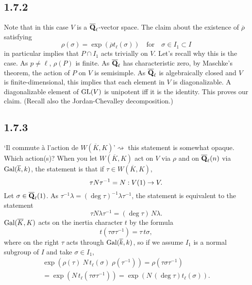 \documentclass[deligne.tex]{subfiles}
\begin{document}
\subsection*{1.7.2}
Note that in this case $V$ is a $\overline{\mathbf{Q}}_\ell$-vector space.
The claim about the existence of $\overline\rho$ satisfying
\begin{equation*}
	\rho(\sigma)=\exp(\overline\rho t_\ell(\sigma))\quad\text{for}\quad
	\sigma\in I_1\subset I
\end{equation*}
in particular implies that $P\cap I_1$ acts trivially on $V$.
Let's recall why this is the case.
As $p\ne\ell$, $\rho(P)$ is finite. As $\overline{\mathbf{Q}}_\ell$ has 
characteristic zero, by Maschke's theorem, the action of $P$ on $V$ is 
semisimple. As $\overline{\mathbf{Q}}_\ell$ is algebraically closed and $V$ is
finite-dimensional, this implies that each element in $V$ is 
diagonalizable. A diagonalizable element of $\operatorname{GL}(V)$ is unipotent iff it is
the identity. This proves our claim. (Recall also the Jordan-Chevalley
decomposition.)

\subsection*{1.7.3} `Il commute à l'action de
$W(\overline K,K)$'$\rightsquigarrow$ this statement is somewhat opaque.
Which action(s)? When you let $W(\overline K,K)$ act on $V$ via $\rho$ and
on $\overline{\mathbf{Q}}_\ell(n)$ via $\operatorname{Gal}(\overline k,k)$, the statement is that
if $\tau\in W(\overline K,K)$,
\begin{equation*}\tau N\tau^{-1}=N:V(1)\rightarrow V.\end{equation*}
Let $\sigma\in\overline{\mathbf{Q}}_\ell(1)$.
As $\tau^{-1}\lambda=(\deg\tau)^{-1}\lambda\tau^{-1}$, the statement is 
equivalent to the statement
\begin{equation*}
	\tau N\lambda\tau^{-1}=(\deg\tau)\,N\lambda.
\end{equation*}
$\operatorname{Gal}(\overline K,K)$ acts on the inertia character $t$ by the formula
\begin{equation*}
	t(\tau\sigma\tau^{-1})=\tau\,t\sigma,
\end{equation*}
where on the right $\tau$ acts through $\operatorname{Gal}(\overline k,k)$, so if
we assume $I_1$ is a normal subgroup of $I$ and take $\sigma\in I_1$,
\begin{multline*}
	\exp(\rho(\tau)\;N\,t_\ell(\sigma)\;\rho(\tau^{-1}))
	=\rho(\tau\sigma\tau^{-1}) \\
	=\exp(N\,t_\ell(\tau\sigma\tau^{-1}))
	=\exp(N\,(\deg\tau)t_\ell(\sigma)).
\end{multline*}
\end{document}
